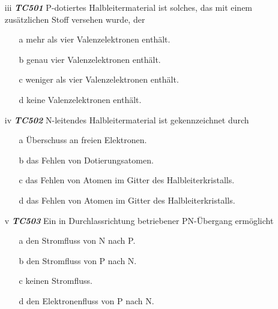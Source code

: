 \begin{enumerate}
\item[iii] \emph{\textbf{TC501}}    P-dotiertes Halbleitermaterial ist solches, das mit einem zusätzlichen Stoff versehen wurde, der
	\begin{enumerate}
	\itemsep1pt\parskip0pt
		\item[a] mehr als vier Valenzelektronen enthält.
		\item[b] genau vier Valenzelektronen enthält.
		\item[c] weniger als vier Valenzelektronen enthält.
		\item[d] keine Valenzelektronen enthält.
	\end{enumerate}
\end{enumerate}


\begin{enumerate}
\item[iv] \emph{\textbf{TC502}}   N-leitendes Halbleitermaterial ist gekennzeichnet durch
	\begin{enumerate}
	\itemsep1pt\parskip0pt
		\item[a] Überschuss an freien Elektronen.
		\item[b] das Fehlen von Dotierungsatomen.
		\item[c] das Fehlen von Atomen im Gitter des Halbleiterkristalls.
		\item[d] das Fehlen von Atomen im Gitter des Halbleiterkristalls.
	\end{enumerate}
\end{enumerate}


\begin{enumerate}
\item[v] \emph{\textbf{TC503}}  Ein in Durchlassrichtung betriebener PN-Übergang ermöglicht
	\begin{enumerate}
	\itemsep1pt\parskip0pt
		\item[a] den Stromfluss von N nach P.
		\item[b] den Stromfluss von P nach N.
		\item[c] keinen Stromfluss.
		\item[d] den Elektronenfluss von P nach N.
	\end{enumerate}
\end{enumerate}





